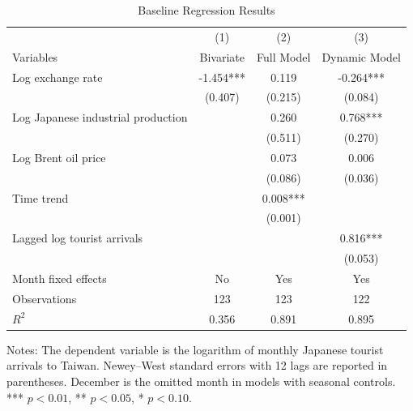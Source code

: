 \begin{table}[H]
\centering
\caption{Baseline Regression Results}
\label{tab:mainreg}
\begin{threeparttable}
\begin{tabular}{lccc}
\toprule
 & (1) & (2) & (3) \\
Variables & Bivariate & Full Model & Dynamic Model \\
\midrule
Log exchange rate & -1.454*** & 0.119 & -0.264*** \\
 & (0.407) & (0.215) & (0.084) \\
Log Japanese industrial production &  & 0.260 & 0.768*** \\
 &  & (0.511) & (0.270) \\
Log Brent oil price &  & 0.073 & 0.006 \\
 &  & (0.086) & (0.036) \\
Time trend &  & 0.008*** &  \\
 &  & (0.001) &  \\
Lagged log tourist arrivals &  &  & 0.816*** \\
 &  &  & (0.053) \\
\midrule
Month fixed effects & No & Yes & Yes \\
Observations & 123 & 123 & 122 \\
$R^2$ & 0.356 & 0.891 & 0.895 \\
\bottomrule
\end{tabular}
\begin{tablenotes}[flushleft]
\footnotesize \item Notes: The dependent variable is the logarithm of monthly Japanese tourist arrivals to Taiwan. Newey--West standard errors with 12 lags are reported in parentheses. December is the omitted month in models with seasonal controls. *** $p<0.01$, ** $p<0.05$, * $p<0.10$.
\end{tablenotes}
\end{threeparttable}
\end{table}
